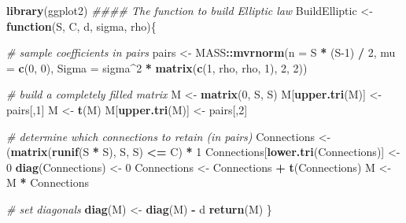 \documentclass[
]{book}
\newenvironment{Shaded}{\begin{snugshade}}{\end{snugshade}}
\newcommand{\CommentTok}[1]{\textcolor[rgb]{0.56,0.35,0.01}{\textit{#1}}}
\newcommand{\ControlFlowTok}[1]{\textcolor[rgb]{0.13,0.29,0.53}{\textbf{#1}}}
\newcommand{\DataTypeTok}[1]{\textcolor[rgb]{0.13,0.29,0.53}{#1}}
\newcommand{\DecValTok}[1]{\textcolor[rgb]{0.00,0.00,0.81}{#1}}
\newcommand{\KeywordTok}[1]{\textcolor[rgb]{0.13,0.29,0.53}{\textbf{#1}}}
\newcommand{\NormalTok}[1]{#1}
\newcommand{\OperatorTok}[1]{\textcolor[rgb]{0.81,0.36,0.00}{\textbf{#1}}}
\newcommand{\StringTok}[1]{\textcolor[rgb]{0.31,0.60,0.02}{#1}}
\begin{document}
\begin{Shaded}
\begin{Highlighting}[]
\KeywordTok{library}\NormalTok{(ggplot2)}
\CommentTok{#### The function to build Elliptic law}
\NormalTok{BuildElliptic <-}\StringTok{ }\ControlFlowTok{function}\NormalTok{(S, C, d, sigma, rho)\{}
  
  \CommentTok{# sample coefficients in pairs}
\NormalTok{  pairs <-}\StringTok{ }\NormalTok{MASS}\OperatorTok{::}\KeywordTok{mvrnorm}\NormalTok{(}\DataTypeTok{n =}\NormalTok{ S }\OperatorTok{*}\StringTok{ }\NormalTok{(S}\DecValTok{-1}\NormalTok{) }\OperatorTok{/}\StringTok{ }\DecValTok{2}\NormalTok{,}
                         \DataTypeTok{mu =} \KeywordTok{c}\NormalTok{(}\DecValTok{0}\NormalTok{, }\DecValTok{0}\NormalTok{),}
                         \DataTypeTok{Sigma =}\NormalTok{ sigma}\OperatorTok{^}\DecValTok{2} \OperatorTok{*}\StringTok{ }\KeywordTok{matrix}\NormalTok{(}\KeywordTok{c}\NormalTok{(}\DecValTok{1}\NormalTok{, rho, rho, }\DecValTok{1}\NormalTok{), }\DecValTok{2}\NormalTok{, }\DecValTok{2}\NormalTok{))}
  
  \CommentTok{# build a completely filled matrix}
\NormalTok{  M <-}\StringTok{ }\KeywordTok{matrix}\NormalTok{(}\DecValTok{0}\NormalTok{, S, S)}
\NormalTok{  M[}\KeywordTok{upper.tri}\NormalTok{(M)] <-}\StringTok{ }\NormalTok{pairs[,}\DecValTok{1}\NormalTok{]}
\NormalTok{  M <-}\StringTok{ }\KeywordTok{t}\NormalTok{(M)}
\NormalTok{  M[}\KeywordTok{upper.tri}\NormalTok{(M)] <-}\StringTok{ }\NormalTok{pairs[,}\DecValTok{2}\NormalTok{]}
  
  \CommentTok{# determine which connections to retain (in pairs)}
\NormalTok{  Connections <-}\StringTok{ }\NormalTok{(}\KeywordTok{matrix}\NormalTok{(}\KeywordTok{runif}\NormalTok{(S }\OperatorTok{*}\StringTok{ }\NormalTok{S), S, S) }\OperatorTok{<=}\StringTok{ }\NormalTok{C) }\OperatorTok{*}\StringTok{ }\DecValTok{1} 
\NormalTok{  Connections[}\KeywordTok{lower.tri}\NormalTok{(Connections)] <-}\StringTok{ }\DecValTok{0}
  \KeywordTok{diag}\NormalTok{(Connections) <-}\StringTok{ }\DecValTok{0}
\NormalTok{  Connections <-}\StringTok{ }\NormalTok{Connections }\OperatorTok{+}\StringTok{ }\KeywordTok{t}\NormalTok{(Connections)}
\NormalTok{  M <-}\StringTok{ }\NormalTok{M }\OperatorTok{*}\StringTok{ }\NormalTok{Connections}
  
  \CommentTok{# set diagonals}
  \KeywordTok{diag}\NormalTok{(M) <-}\StringTok{ }\KeywordTok{diag}\NormalTok{(M) }\OperatorTok{-}\StringTok{ }\NormalTok{d}
  \KeywordTok{return}\NormalTok{(M)}
\NormalTok{\}}
\end{Highlighting}
\end{Shaded}
\end{document}
